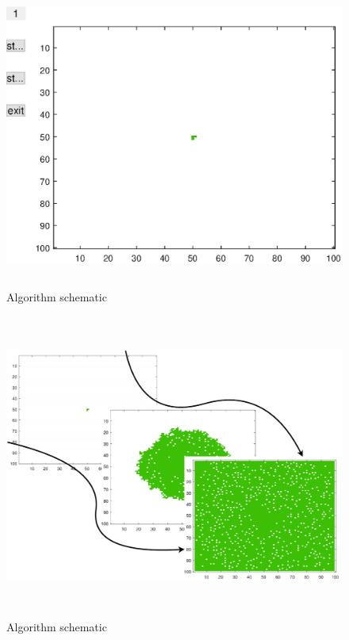 \documentclass{mcmthesis}
\begin{document}
\begin{figure}[H] 
	\centering 
	\includegraphics[height=10cm]{./picture/suppose0.eps}
	\caption{Algorithm schematic}
	\label{AS}
\end{figure}
\par 
\begin{figure}[H] 
	\centering 
	\includegraphics[height=10cm]{./picture/SJflow.pdf}
	\caption{Algorithm schematic}
\end{figure}
\end{document}
